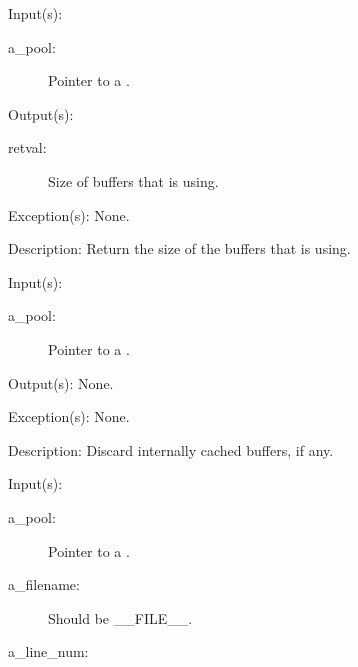 \begin{capi}
	\begin{capilist}
	\item[Input(s): ]
		\begin{description}\item[]
		\item[a\_pool: ]
			Pointer to a .
		\end{description}
	\item[Output(s): ]
		\begin{description}\item[]
		\item[retval: ]
			Size of buffers that  is using.
		\end{description}
	\item[Exception(s): ] None.
	\item[Description: ]
		Return the size of the buffers that  is using.
	\end{capilist}
\label{pool_drain}
	\begin{capilist}
	\item[Input(s): ]
		\begin{description}\item[]
		\item[a\_pool: ]
			Pointer to a \classname{pool}.
		\end{description}
	\item[Output(s): ] None.
	\item[Exception(s): ] None.
	\item[Description: ]
		Discard internally cached buffers, if any.
	\end{capilist}
\label{pool_get_e}
\label{pool_get}
	\begin{capilist}
	\item[Input(s): ]
		\begin{description}\item[]
		\item[a\_pool: ]
			Pointer to a .
		\item[a\_filename: ]
			Should be \_\_FILE\_\_.
		\item[a\_line\_num: ]

\end{description}
\end{capilist}
\end{capi}
